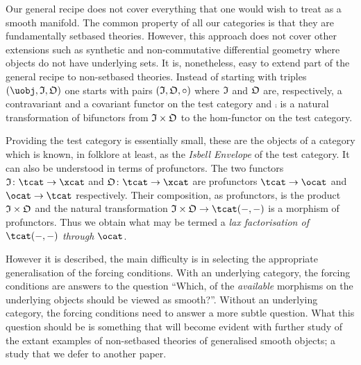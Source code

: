 \documentclass[%
a4paper,%
arxiv,%
defaults
]{myclass}
\begin{document}
Our general recipe does not cover everything that one would wish to treat as a smooth manifold.
The common property of all our categories is that they are fundamentally set\enhyp{}based theories.
However, this approach does not cover other extensions such as synthetic and non\hyp{}commutative differential geometry where objects  do not have underlying sets.
It is, nonetheless, easy to extend part of the general recipe to non\hyp{}set\enhyp{}based theories.
Instead of starting with triples \((\uobj, \itest, \otest)\) one  starts with pairs \((\itest, \otest, \comp)\) where \(\itest\) and \(\otest\) are, respectively, a contravariant and a covariant functor on the test category and \(\comp\) is a natural transformation of bifunctors from \(\itest \times \otest\) to the hom\hyp{}functor on the test category.

Providing the test category is essentially small, these are the objects of a category which is known, in folklore at least, as the \emph{Isbell Envelope} of the test category.
It can also be understood in terms of profunctors.
The two functors \(\itest \colon \tcat \to \xcat\) and \(\otest \colon \tcat \to \xcat\) are profunctors \(\tcat \to \ocat\) and \(\ocat \to \tcat\) respectively.
Their composition, as profunctors, is the product \(\itest \times \otest\) and the natural transformation \(\itest \times \otest \to \Hom{\tcat}{-}{-}\) is a morphism of profunctors.
Thus we obtain what may be termed a \emph{lax factorisation of \(\Hom{\tcat}{-}{-}\) through \(\ocat\)}.

However it is described, the main difficulty is in selecting the appropriate generalisation of the forcing conditions.
With an underlying category, the forcing conditions are answers to the question ``Which, of the \emph{available} morphisms on the underlying objects should be viewed as smooth?''.
Without an underlying category, the forcing conditions need to answer a more subtle question.
What this question should be is something that will become evident with further study of the extant examples of non\hyp{}set\enhyp{}based theories of generalised smooth objects; a study that we defer to another paper.



\end{document}
